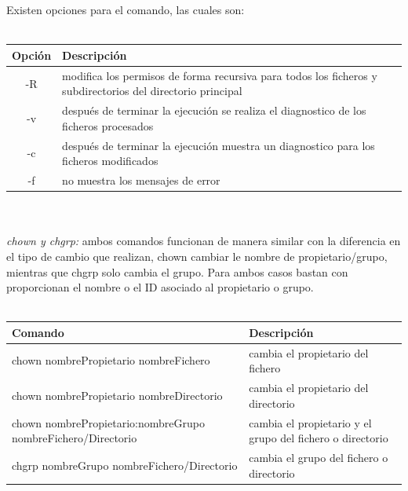 \documentclass[10pt,a4paper,titlepage]{article}
\begin{document}
	\\
	\\
	Existen opciones para el comando, las cuales son:
	\\
	\\
	\begin{tabular}{|c|p{8cm}|}
		\hline
		Opción & Descripción \\
		\hline
		-R & modifica los permisos de forma recursiva para todos los ficheros y subdirectorios del directorio principal \\
		\hline
		-v & después de terminar la ejecución se realiza el diagnostico de los ficheros procesados \\
		\hline
		-c & después de terminar la ejecución muestra un diagnostico para los ficheros modificados \\ 
		\hline
		-f & no muestra los mensajes de error \\
		\hline
	\end{tabular}
	\\
	\\
	\emph{chown y chgrp:} ambos comandos funcionan de manera similar con la diferencia en el tipo de cambio que realizan, chown cambiar le nombre de propietario/grupo, mientras que chgrp solo cambia el grupo. Para ambos casos bastan con proporcionan el nombre o el ID asociado al propietario o grupo.
	\\
	\\
	\begin{tabular}{|p{7cm}|p{7cm}|}
		\hline
		Comando & Descripción \\
		\hline
		chown nombrePropietario nombreFichero & cambia el propietario del fichero \\
		\hline
		chown nombrePropietario nombreDirectorio & cambia el propietario del directorio \\
		\hline
		chown nombrePropietario:nombreGrupo nombreFichero/Directorio & cambia el propietario y el grupo del fichero o directorio \\
		\hline
		chgrp nombreGrupo nombreFichero/Directorio & cambia el grupo del fichero o directorio \\
		\hline
	\end{tabular}
	
	
\end{document}
